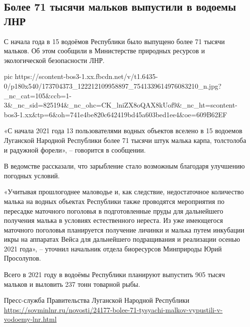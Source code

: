  
 
 
 
 

\subsection{Более 71 тысячи мальков выпустили в водоемы ЛНР}

С начала года в 15 водоёмов Республики было выпущено более 71 тысячи мальков.
Об этом сообщили в Министерстве природных ресурсов и экологической безопасности
ЛНР.

\ifcmt
  pic https://scontent-bos3-1.xx.fbcdn.net/v/t1.6435-0/p180x540/173704373_122212109958897_7541339614976083210_n.jpg?_nc_cat=105&ccb=1-3&_nc_sid=825194&_nc_ohc=CK_lniZX8oQAX8kUof9&_nc_ht=scontent-bos3-1.xx&tp=6&oh=741e4be820c642419bd45a603bed1ee4&oe=609B62EF
\fi

«С начала 2021 года 13 пользователями водных объектов вселено в 15 водоемов
Луганской Народной Республики более 71 тысячи штук малька карпа, толстолоба и
радужной форели», – говорится в сообщении.

В ведомстве рассказали, что зарыбление стало возможным благодаря улучшению погодных условий.

«Учитывая прошлогоднее маловодье и, как следствие, недостаточное количество
малька на водных объектах Республики также проводятся мероприятия по пересадке
маточного поголовья в подготовленные пруды для дальнейшего получения малька в
условиях естественного нереста. Из уже имеющегося маточного поголовья
планируется получение личинки и малька путем инкубации икры на аппаратах Вейса
для дальнейшего подращивания и реализации осенью 2021 года», – уточнил
начальник отдела биоресурсов Минприроды Юрий Просолупов.

Всего в 2021 году в водоёмы Республики планируют выпустить 905 тысяч мальков и
выловить 237 тонн товарной рыбы.

Пресс-служба Правительства Луганской Народной Республики
\url{https://sovminlnr.ru/novosti/24177-bolee-71-tysyachi-malkov-vypustili-v-vodoemy-lnr.html}
